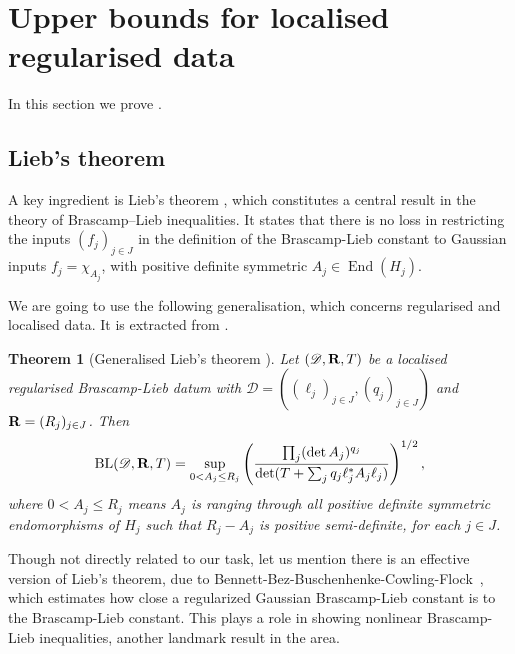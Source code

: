 \documentclass[a4paper,english]{amsart}
\newtheorem{thm}{Theorem}[section]
\theoremstyle{definition}
\newcommand{\R}{\mathbb{R}}
\newcommand{\sN}{\mathscr{N}}
\newcommand{\1}{\mathbbm{1}}
\newcommand{\bbR}{{\bf{R}}}
\newcommand{\sD} {{\mathscr D}}
\DeclareMathOperator{\End}{End}
\DeclareMathOperator{\BL}{BL}
\begin{document}
\section{Upper bounds for localised regularised  data}
In this section we prove .

\subsection{Lieb's theorem}
A key ingredient is Lieb’s theorem \cite[Theorem 6.2]{Lieb}, which constitutes a central result in the theory of  Brascamp–Lieb inequalities.
It states that there is no loss in restricting the inputs $(f_j)_{j \in J}$ in the definition of the Brascamp-Lieb constant to Gaussian inputs $f_j = \chi_{A_j}$, with positive definite symmetric $A_j \in \End(H_j)$.

We are going to use the following generalisation, which concerns regularised and localised  data. It is extracted from \cite[Corollary 8.15]{BCCT08}.
\begin{thm}[Generalised Lieb's theorem {\cite{BCCT08}}] \label{general-Liebthm}
Let $(\sD,\bbR, T)$ be a localised regularised   Brascamp-Lieb datum with $\sD=((\ell_{j})_{j\in J}, (q_{j})_{j\in J})$ and $\bbR=(R_{j})_{j\in J}$.
Then
\begin{equation}\label{gaussian-upp}
\BL(\sD, \bbR, T)
= \sup_{0<A_{j}\leq R_{j}} \left(\frac{ \prod_{j}(\det A_{j})^{q_{j}}}{\det(T+\sum_{j} q_{j} \ell_{j}^*A_{j}\ell_{j} )}\right)^{1/2},
\end{equation}
where $0 < A_j \leq R_j$ means $A_j$ is ranging through all positive definite symmetric endomorphisms of $H_j$ such that $R_j - A_j$ is positive semi-definite, for each $j \in J$.
\end{thm}


Though not directly related to our task, let us mention there is an effective version of Lieb's theorem, due to Bennett-Bez-Buschenhenke-Cowling-Flock~\cite[Theorem 1.3]{BBBCF}, which estimates how close a regularized Gaussian Brascamp-Lieb constant is  to the Brascamp-Lieb constant. This plays a role  in showing nonlinear Brascamp-Lieb inequalities, another landmark result in the area.

\end{document}
